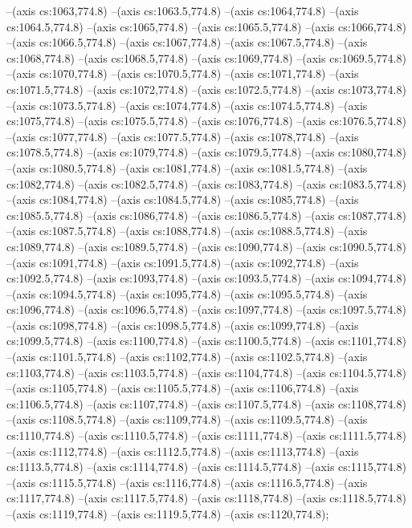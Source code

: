 --(axis cs:1063,774.8)
--(axis cs:1063.5,774.8)
--(axis cs:1064,774.8)
--(axis cs:1064.5,774.8)
--(axis cs:1065,774.8)
--(axis cs:1065.5,774.8)
--(axis cs:1066,774.8)
--(axis cs:1066.5,774.8)
--(axis cs:1067,774.8)
--(axis cs:1067.5,774.8)
--(axis cs:1068,774.8)
--(axis cs:1068.5,774.8)
--(axis cs:1069,774.8)
--(axis cs:1069.5,774.8)
--(axis cs:1070,774.8)
--(axis cs:1070.5,774.8)
--(axis cs:1071,774.8)
--(axis cs:1071.5,774.8)
--(axis cs:1072,774.8)
--(axis cs:1072.5,774.8)
--(axis cs:1073,774.8)
--(axis cs:1073.5,774.8)
--(axis cs:1074,774.8)
--(axis cs:1074.5,774.8)
--(axis cs:1075,774.8)
--(axis cs:1075.5,774.8)
--(axis cs:1076,774.8)
--(axis cs:1076.5,774.8)
--(axis cs:1077,774.8)
--(axis cs:1077.5,774.8)
--(axis cs:1078,774.8)
--(axis cs:1078.5,774.8)
--(axis cs:1079,774.8)
--(axis cs:1079.5,774.8)
--(axis cs:1080,774.8)
--(axis cs:1080.5,774.8)
--(axis cs:1081,774.8)
--(axis cs:1081.5,774.8)
--(axis cs:1082,774.8)
--(axis cs:1082.5,774.8)
--(axis cs:1083,774.8)
--(axis cs:1083.5,774.8)
--(axis cs:1084,774.8)
--(axis cs:1084.5,774.8)
--(axis cs:1085,774.8)
--(axis cs:1085.5,774.8)
--(axis cs:1086,774.8)
--(axis cs:1086.5,774.8)
--(axis cs:1087,774.8)
--(axis cs:1087.5,774.8)
--(axis cs:1088,774.8)
--(axis cs:1088.5,774.8)
--(axis cs:1089,774.8)
--(axis cs:1089.5,774.8)
--(axis cs:1090,774.8)
--(axis cs:1090.5,774.8)
--(axis cs:1091,774.8)
--(axis cs:1091.5,774.8)
--(axis cs:1092,774.8)
--(axis cs:1092.5,774.8)
--(axis cs:1093,774.8)
--(axis cs:1093.5,774.8)
--(axis cs:1094,774.8)
--(axis cs:1094.5,774.8)
--(axis cs:1095,774.8)
--(axis cs:1095.5,774.8)
--(axis cs:1096,774.8)
--(axis cs:1096.5,774.8)
--(axis cs:1097,774.8)
--(axis cs:1097.5,774.8)
--(axis cs:1098,774.8)
--(axis cs:1098.5,774.8)
--(axis cs:1099,774.8)
--(axis cs:1099.5,774.8)
--(axis cs:1100,774.8)
--(axis cs:1100.5,774.8)
--(axis cs:1101,774.8)
--(axis cs:1101.5,774.8)
--(axis cs:1102,774.8)
--(axis cs:1102.5,774.8)
--(axis cs:1103,774.8)
--(axis cs:1103.5,774.8)
--(axis cs:1104,774.8)
--(axis cs:1104.5,774.8)
--(axis cs:1105,774.8)
--(axis cs:1105.5,774.8)
--(axis cs:1106,774.8)
--(axis cs:1106.5,774.8)
--(axis cs:1107,774.8)
--(axis cs:1107.5,774.8)
--(axis cs:1108,774.8)
--(axis cs:1108.5,774.8)
--(axis cs:1109,774.8)
--(axis cs:1109.5,774.8)
--(axis cs:1110,774.8)
--(axis cs:1110.5,774.8)
--(axis cs:1111,774.8)
--(axis cs:1111.5,774.8)
--(axis cs:1112,774.8)
--(axis cs:1112.5,774.8)
--(axis cs:1113,774.8)
--(axis cs:1113.5,774.8)
--(axis cs:1114,774.8)
--(axis cs:1114.5,774.8)
--(axis cs:1115,774.8)
--(axis cs:1115.5,774.8)
--(axis cs:1116,774.8)
--(axis cs:1116.5,774.8)
--(axis cs:1117,774.8)
--(axis cs:1117.5,774.8)
--(axis cs:1118,774.8)
--(axis cs:1118.5,774.8)
--(axis cs:1119,774.8)
--(axis cs:1119.5,774.8)
--(axis cs:1120,774.8);


